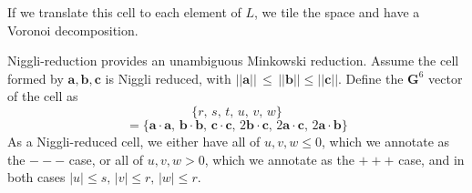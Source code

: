 \documentclass[preprint]{iucr}              %
\begin{document}
If we translate this cell to each element of $L$, we tile the space and have a
Voronoi decomposition. 


Niggli-reduction provides an unambiguous Minkowski reduction. Assume the cell formed by $\mathbf{a}, \mathbf{b}, \mathbf{c}$ is Niggli reduced, with  $||\mathbf{a}||\, \leq\, ||\mathbf{b}|| \leq ||\mathbf{c}||$.  Define the $\mathbf{G}^6$ vector of
the cell as
\[
\{r,\,s,\,t,\,u,\,v,\,w\}
\]
\[=\{ \mathbf{a} \cdot \mathbf{a},\, \mathbf{b} \cdot \mathbf{b},\, \mathbf{c} \cdot \mathbf{c},\,  2 \mathbf{b} \cdot \mathbf{c},\, 2 \mathbf{a} \cdot \mathbf{c},\, 2 \mathbf{a} \cdot \mathbf{b}\}
\]
As a Niggli-reduced cell, we either have all of $u,v,w \leq 0$, which we
annotate as the $---$ case, or all of $u,v,w > 0$, which we annotate
as the $+++$ case, and in both cases $|u| \leq s,\, |v| \leq r,\, |w| \leq r$.
\end{document}
